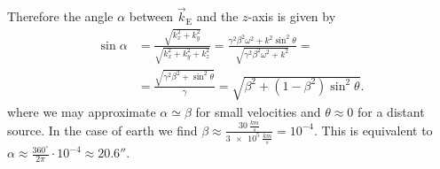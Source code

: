 \documentclass[english, parskip=full]{scrartcl}
\newcommand{\kla}{}
\newcommand{\tecxt}{}
\begin{document}
Therefore the angle $\alpha$ between $\vec{k}_\tecxt\text{E}$ and the $z$-axis is given by
\begin{align}
\sin\alpha &= \frac{\sqrt{k_x^2 + k_y^2}}{\sqrt{k_x^2 + k_y^2 + k_z^2}} = \frac{\gamma^2\beta^2\omega^2 + k^2\sin^2\theta}{\sqrt{\gamma^2\beta^2\omega^2 + k^2}} = \\
&= \frac{\sqrt{\gamma^2\beta^2 + \sin^2\theta}}{\gamma} = \sqrt{\beta^2 + (1-\beta^2)\sin^2\theta}.
\end{align}
where we may approximate $\alpha\simeq \beta$ for small velocities and $\theta \approx 0$ for a distant source.
In the case of earth we find $\beta \approx \frac{\SI{30}{\frac{km}{s}}}{\SI{3e5}{\frac{km}{s}}} = 10^{-4}$.
This is equivalent to $\alpha\approx \frac{360^\circ}{2\pi}\cdot 10^{-4} \approx 20.6''$.
\end{document}
